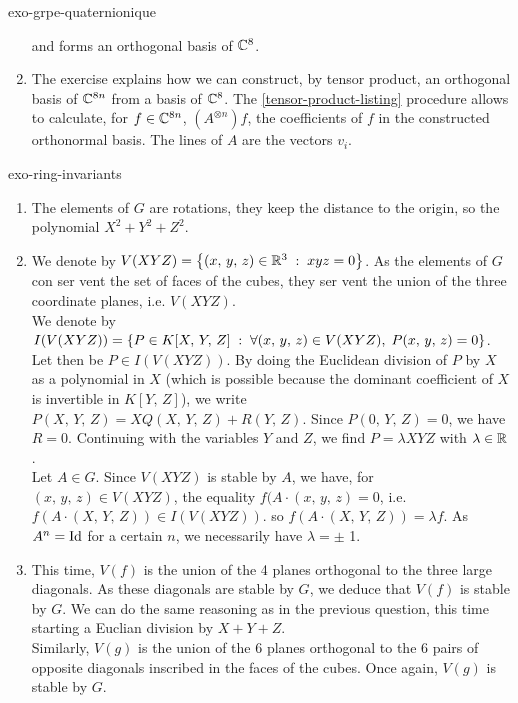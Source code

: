 \begin{correction}{exo-grpe-quaternionique}
\begin{enumerate}
\begin{equation*}
\end{equation*}
and forms an orthogonal basis of $ \mathbb{C}^8 $.
\item The exercise  explains how we can construct, by tensor product, an orthogonal basis of $ \mathbb{C}^{8n} $ from a basis of $ \mathbb{C}^8 $. The \Matlab{} \ref{tensor-product-listing} procedure allows to calculate, for $ f \in \mathbb{C}^{8 n} $, $ (A^{\otimes n}) f $, the coefficients of $ f $ in the constructed orthonormal basis. The lines of $ A $ are the vectors $ v_i $.
\end{enumerate}
\end{correction}
 
 
\begin{correction}{exo-ring-invariants}
\begin{enumerate}
\item The elements of $ G $ are rotations, they keep the distance to the origin, so the polynomial $ X^2 + Y^2 + Z^2 $.
\item We denote by $ V (XYZ) = \left\{ (x, \, y, \, z) \in \mathbb{R}^3 \;:\; xyz = 0 \right\} $. As the elements of $ G $ con \-ser \-vent the set of faces of the cubes, they \-ser \-vent the union of the three coordinate planes, i.e. $ V (XYZ ) $. \\We denote by $ I (V (XYZ)) = \left\{ P \in K [X, \, Y, \, Z] \;:\; \forall (x, \, y, \, z) \in V (XYZ), \; P (x, \, y, \, z) = 0 \right\} $. Let then be $ P \in I (V (XYZ)) $. By doing the Euclidean division of $ P $ by $ X $ as a polynomial in $ X $ (which is possible because the dominant coefficient of $ X $ is invertible in $ K [Y, \, Z] $), we write $ P (X, \, Y, \, Z) = XQ (X, \, Y, \, Z) + R (Y, \, Z) $. Since $ P (0, \, Y, \, Z) = 0 $, we have $ R = 0 $. Continuing with the variables $ Y $ and $ Z $, we find $ P = \lambda XYZ $ with $ \lambda \in \mathbb{R} $. \\Let $ A \in G $. Since $ V (XYZ) $ is stable by $ A $, we have, for $ (x, \, y, \, z) \in V (XYZ) $, the equality $ f(A \cdot (x, \, y, \, z) = 0 $, i.e. $ f(A \cdot (X, \, Y, \, Z)) \in I (V (XYZ)) $. so $ f(A \cdot (X, \, Y, \, Z)) = \lambda f $. As $ A^n = \operatorname{Id} $ for a certain $ n $, we necessarily have $ \lambda = \pm $ 1.
\item This time, $ V (f) $ is the union of the 4 planes orthogonal to the three large diagonals. As these diagonals are stable by $ G $, we deduce that $ V (f) $ is stable by $ G $. We can do the same reasoning as in the previous question, this time starting a Euclian division by $ X + Y + Z $. \\Similarly, $ V (g) $ is the union of the 6 planes orthogonal to the 6 pairs of opposite diagonals inscribed in the faces of the cubes. Once again, $ V (g) $ is stable by $ G $.
\end{enumerate}
\end{correction}
 
